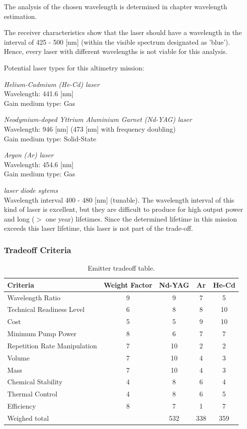 The analysis of the chosen wavelength is determined in chapter wavelength estimation.

The receiver characteristics show that the laser should have a wavelength in the interval of 425 - 500 [nm] (within the visible spectrum designated as 'blue'). Hence, every \acs{laser} with different wavelengths is not viable for this analysis.

Potential \acs{laser} types for this altimetry mission:

\textit{Helium-Cadmium (He-Cd) \acs{laser}}\\
Wavelength: 441.6 [nm]\\
Gain medium type: Gas

\textit{Neodymium-doped Yttrium Aluminium Garnet (Nd-YAG) \acs{laser}}\\
Wavelength: 946 [nm] (473 [nm] with frequency doubling)\\
Gain medium type: Solid-State

\textit{Argon (Ar) \acs{laser}}\\	
Wavelength: 454.6 [nm]\\
Gain medium type: Gas

\textit{\acs{laser} diode sytems}\\
Wavelength interval 400 - 480 [nm] (tunable). The wavelength interval of this kind of \acs{laser} is excellent, but they are difficult to produce for high output power and long ($>$ one year) lifetimes. Since the determined lifetime in this mission exceeds this \acs{laser} lifetime, this \acs{laser} is not part of the trade-off.
	
	\subsubsection{Tradeoff Criteria}

\begin{table}[h]
	\centering
		\begin{tabular}{l|c|c|c|c}
		 \textbf{Criteria} & \textbf{Weight Factor} & \textbf{Nd-YAG} & \textbf{Ar} & \textbf{He-Cd} \\ \hline \hline
		 Wavelength Ratio & 9 & 9 & 7 & 5 \\
		 Technical Readiness Level & 6 & 8 & 8 & 10 \\
		 Cost & 5 & 5 & 9 & 10 \\ 
		 Minimum Pump Power & 8 & 6 & 7 & 7 \\
		 Repetition Rate Manipulation & 7 & 10 & 2 & 2 \\ 
		 Volume & 7 & 10 & 4 & 3 \\ 
		 Mass & 7 & 10 & 4 & 3  \\
		 Chemical Stability & 4 & 8 & 6 & 4 \\
		 Thermal Control & 4 & 8 & 6 & 5 \\
		 Efficiency & 8 & 7 & 1 & 7 \\ \hline
		 Weighed total &   & 532 & 338 & 359
			
		\end{tabular}
	\caption{Emitter tradeoff table.}
	\label{table:emitterTradeTable}
\end{table}

